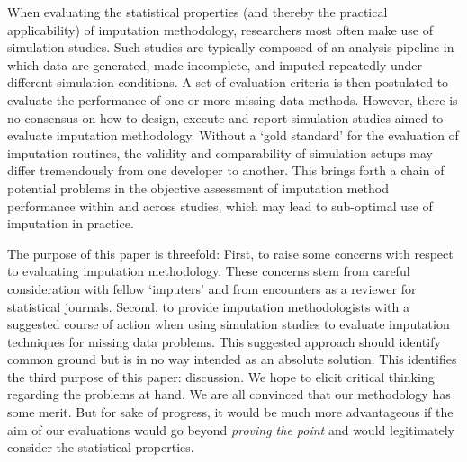 \documentclass[bimj,fleqn]{w-art}
\begin{document}

When evaluating the statistical properties (and thereby the practical applicability) of imputation methodology, researchers most often make use of simulation studies. Such studies are typically composed of an analysis pipeline in which data are generated, made incomplete, and imputed repeatedly under different simulation conditions. A set of evaluation criteria is then postulated to evaluate the performance of one or more missing data methods. However, there is no consensus on how to design, execute and report simulation studies aimed to evaluate imputation methodology. Without a `gold standard' for the evaluation of imputation routines, the validity and comparability of simulation setups may differ tremendously from one developer to another. This brings forth a chain of potential problems in the objective assessment of imputation method performance within and across studies, which may lead to sub-optimal use of imputation in practice.


The purpose of this paper is threefold: First, to raise some concerns with respect to evaluating imputation methodology. These concerns stem from careful consideration with fellow `imputers' and from encounters as a reviewer for statistical journals. Second, to provide imputation methodologists with a suggested course of action when using simulation studies to evaluate imputation techniques for missing data problems. This suggested approach should identify common ground but is in no way intended as an absolute solution. This identifies the third purpose of this paper: discussion. We hope to elicit critical thinking regarding the problems at hand. We are all convinced that our methodology has some merit. But for sake of progress, it would be much more advantageous if the aim of our evaluations would go beyond \textit{proving the point} and would legitimately consider the statistical properties. 
\end{document}
